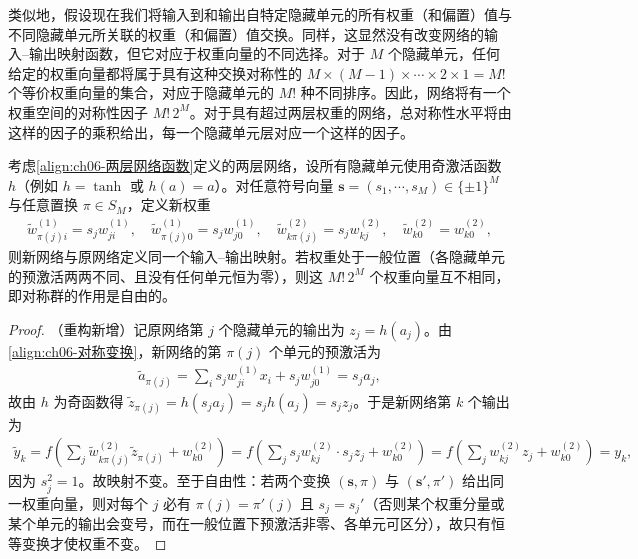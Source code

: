 \documentclass[../../main.tex]{subfiles}
\begin{document}
类似地，假设现在我们将输入到和输出自特定隐藏单元的所有权重（和偏置）值与不同隐藏单元所关联的权重（和偏置）值交换。同样，这显然没有改变网络的输入--输出映射函数，但它对应于权重向量的不同选择。对于 $M$ 个隐藏单元，任何给定的权重向量都将属于具有这种交换对称性的 $M\times(M-1)\times\cdots\times2\times1=M!$ 个等价权重向量的集合，对应于隐藏单元的 $M!$ 种不同排序。因此，网络将有一个权重空间的对称性因子 $M!\,2^{M}$。对于具有超过两层权重的网络，总对称性水平将由这样的因子的乘积给出，每一个隐藏单元层对应一个这样的因子。

\begin{theorem}[权重空间的对称性]\label{theorem:ch06-权重对称性}
考虑\eqref{align:ch06-两层网络函数}定义的两层网络，设所有隐藏单元使用奇激活函数 $h$（例如 $h=\tanh$ 或 $h(a)=a$）。对任意符号向量 $\boldsymbol{s}=(s_1,\cdots,s_M)\in\{\pm1\}^{M}$ 与任意置换 $\pi\in S_M$，定义新权重
\begin{align}
\tilde w_{\pi(j)i}^{(1)}=s_jw_{ji}^{(1)},\quad
\tilde w_{\pi(j)0}^{(1)}=s_jw_{j0}^{(1)},\quad
\tilde w_{k\pi(j)}^{(2)}=s_jw_{kj}^{(2)},\quad
\tilde w_{k0}^{(2)}=w_{k0}^{(2)},
\label{align:ch06-对称变换}
\end{align}
则新网络与原网络定义同一个输入--输出映射。若权重处于一般位置（各隐藏单元的预激活两两不同、且没有任何单元恒为零），则这 $M!\,2^{M}$ 个权重向量互不相同，即对称群的作用是自由的。
\end{theorem}

\begin{proof}
（重构新增）记原网络第 $j$ 个隐藏单元的输出为 $z_j=h(a_j)$。由\eqref{align:ch06-对称变换}，新网络的第 $\pi(j)$ 个单元的预激活为
\begin{align}
\tilde a_{\pi(j)}=\sum_{i}s_jw_{ji}^{(1)}x_i+s_jw_{j0}^{(1)}=s_ja_j,
\end{align}
故由 $h$ 为奇函数得 $\tilde z_{\pi(j)}=h(s_ja_j)=s_jh(a_j)=s_jz_j$。于是新网络第 $k$ 个输出为
\begin{align}
\tilde y_k=f\!\left(\sum_{j}\tilde w_{k\pi(j)}^{(2)}\tilde z_{\pi(j)}+w_{k0}^{(2)}\right)
=f\!\left(\sum_{j}s_jw_{kj}^{(2)}\cdot s_jz_j+w_{k0}^{(2)}\right)
=f\!\left(\sum_{j}w_{kj}^{(2)}z_j+w_{k0}^{(2)}\right)=y_k,
\end{align}
因为 $s_j^{2}=1$。故映射不变。至于自由性：若两个变换 $(\boldsymbol{s},\pi)$ 与 $(\boldsymbol{s}',\pi')$ 给出同一权重向量，则对每个 $j$ 必有 $\pi(j)=\pi'(j)$ 且 $s_j=s_j'$（否则某个权重分量或某个单元的输出会变号，而在一般位置下预激活非零、各单元可区分），故只有恒等变换才使权重不变。
\end{proof}
\end{document}
